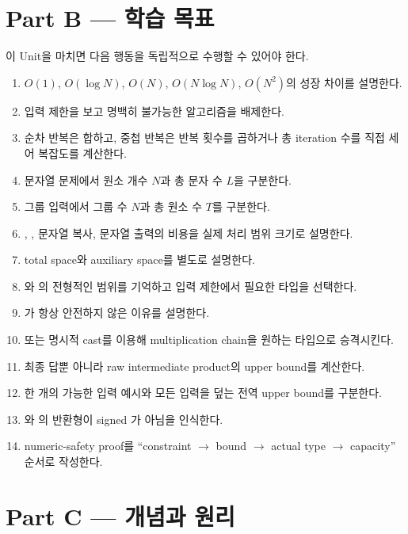 \section{Part B --- 학습 목표}
이 Unit을 마치면 다음 행동을 독립적으로 수행할 수 있어야 한다.

\begin{enumerate}
  \item $O(1)$, $O(\log N)$, $O(N)$, $O(N\log N)$, $O(N^2)$의 성장 차이를 설명한다.
  \item 입력 제한을 보고 명백히 불가능한 알고리즘을 배제한다.
  \item 순차 반복은 합하고, 중첩 반복은 반복 횟수를 곱하거나 총 iteration 수를 직접 세어 복잡도를 계산한다.
  \item 문자열 문제에서 원소 개수 $N$과 총 문자 수 $L$을 구분한다.
  \item 그룹 입력에서 그룹 수 $N$과 총 원소 수 $T$를 구분한다.
  \item {}, , 문자열 복사, 문자열 출력의 비용을 실제 처리 범위 크기로 설명한다.
  \item total space와 auxiliary space를 별도로 설명한다.
  \item {}와 의 전형적인 범위를 기억하고 입력 제한에서 필요한 타입을 선택한다.
  \item {}가 항상 안전하지 않은 이유를 설명한다.
  \item {} 또는 명시적 cast를 이용해 multiplication chain을 원하는 타입으로 승격시킨다.
  \item 최종 답뿐 아니라 raw intermediate product의 upper bound를 계산한다.
  \item 한 개의 가능한 입력 예시와 모든 입력을 덮는 전역 upper bound를 구분한다.
  \item {}와 의 반환형이 signed 가 아님을 인식한다.
  \item numeric-safety proof를 ``constraint $\to$ bound $\to$ actual type $\to$ capacity'' 순서로 작성한다.
\end{enumerate}

\section{Part C --- 개념과 원리}

